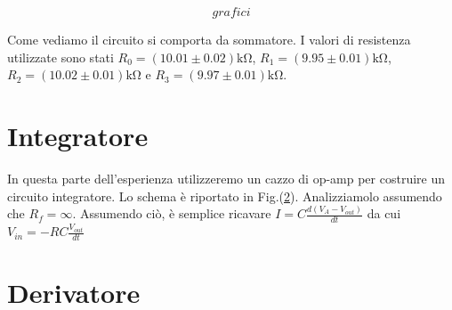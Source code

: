 $$grafici$$

Come vediamo il circuito si comporta da sommatore. I valori di resistenza utilizzate sono stati $R_0=(10.01\pm0.02)\si{\kilo\ohm}$, $R_1=(9.95\pm0.01)\si{\kilo\ohm}$, $R_2=(10.02\pm 0.01)\si{\kilo\ohm}$ e $R_3=(9.97\pm0.01)\si{\kilo\ohm}$.


\section{Integratore}

In questa parte dell'esperienza utilizzeremo un cazzo di op-amp per costruire un circuito integratore. Lo schema è riportato in Fig.(\ref{}). Analizziamolo assumendo che $R_f=\infty$. Assumendo ciò, è semplice ricavare $I=C\frac{d(V_A-V_{out})}{dt}$ da cui $V_{in}=-RC\frac{V_{out}}{dt}$

\section{Derivatore}